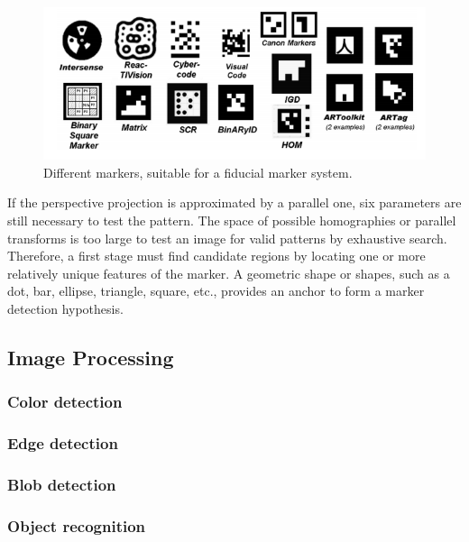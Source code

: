 				
				
				\begin{figure}[H]
					\centering
					\includegraphics[width=0.9\linewidth]{figure/Analysis/fiducialworking.png}
					\caption{Different markers, suitable for a fiducial marker system.}
					\label{fig:fiducialworking}
				\end{figure}
				
			
				
			If the perspective projection is approximated by a parallel one, six parameters are still necessary to test the pattern. The space of possible homographies or parallel transforms is too large to test an image for valid patterns by exhaustive search. Therefore, a first stage must find candidate regions by locating one or more relatively unique features of the marker. A geometric shape or shapes, such as a dot, bar, ellipse, triangle, square, etc., provides an anchor to form a marker detection hypothesis.	


		\subsection{Image Processing}
			\subsubsection{Color detection}
			
			\subsubsection{Edge detection}
			
			\subsubsection{Blob detection}
			
			\subsubsection{Object recognition}

